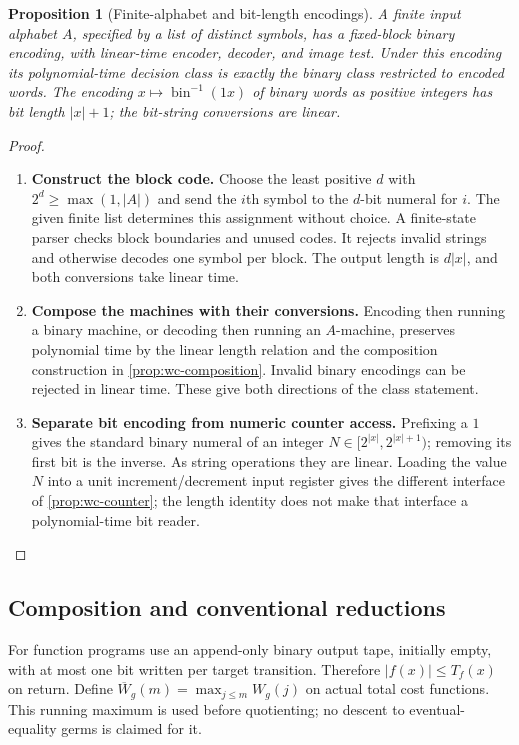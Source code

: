 \documentclass[11pt,a4paper]{article}
\numberwithin{algorithm}{section}
\numberwithin{equation}{section}
\newtheorem{proposition}[proposition]{Proposition}
\theoremstyle{definition}
\theoremstyle{remark}
\theoremstyle{plain}
\theoremstyle{definition}
\theoremstyle{plain}
\begin{document}
\begin{proposition}[Finite-alphabet and bit-length encodings]
\label{prop:wc-encoding}
A finite input alphabet $A$, specified by a list of distinct symbols, has a
fixed-block binary encoding, with linear-time encoder, decoder, and
image test. Under this encoding its polynomial-time decision class
is exactly the binary class restricted to encoded words. The encoding
$x\mapsto\operatorname{bin}^{-1}(1x)$ of binary words as positive
integers has bit length $|x|+1$; the bit-string conversions are linear.
\end{proposition}
\begin{proof}\leavevmode
\begin{enumerate}[leftmargin=*,align=left]
\item \textbf{Construct the block code.}
Choose the least positive $d$ with $2^d\ge\max(1,|A|)$ and send
the $i$th symbol to the $d$-bit numeral for $i$. The given finite list
determines this assignment without choice. A finite-state parser
checks block boundaries and unused codes. It rejects invalid strings
and otherwise decodes one symbol per block. The output length is
$d|x|$, and both conversions take linear time.
\item \textbf{Compose the machines with their conversions.}
Encoding then running a binary machine, or decoding then running an
$A$-machine, preserves polynomial time by the linear length relation
and the composition construction in \cref{prop:wc-composition}.
Invalid binary encodings can be rejected in linear time. These give
both directions of the class statement.
\item \textbf{Separate bit encoding from numeric counter access.}
Prefixing a $1$ gives the standard binary numeral of an integer
$N\in[2^{|x|},2^{|x|+1})$; removing its first bit is the inverse.
As string operations they are linear. Loading the value $N$ into a
unit increment/decrement input register gives the different interface
of \cref{prop:wc-counter}; the length identity does not make that
interface a polynomial-time bit reader.
\end{enumerate}
\end{proof}


\subsection{Composition and conventional reductions}

For function programs use an append-only binary output tape, initially
empty, with at most one bit written per target transition. Therefore
$|f(x)|\le T_f(x)$ on return. Define
$\overline W_g(m)=\max_{j\le m}W_g(j)$ on actual total cost functions.
This running maximum is used before quotienting; no descent to
eventual-equality germs is claimed for it.
\end{document}

